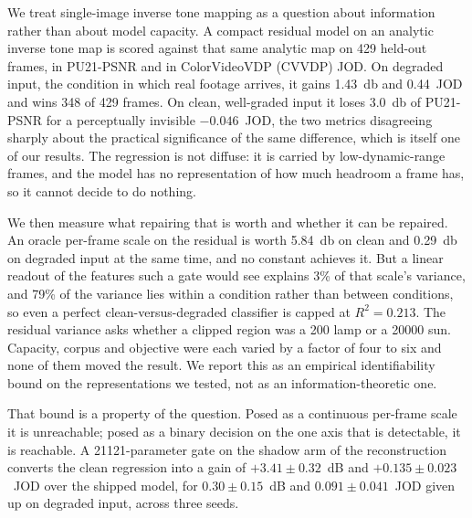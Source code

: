 We treat single-image inverse tone mapping as a question about information
rather than about model capacity. A compact residual model on an analytic
inverse tone map is scored against that same analytic map on 429 held-out
frames, in PU21-PSNR and in ColorVideoVDP (CVVDP) JOD. On degraded input, the
condition in which real footage arrives, it gains \SI{1.43}{\decibel} and
\num{0.44}~JOD and wins 348 of 429 frames. On clean, well-graded input it loses
\SI{3.0}{\decibel} of PU21-PSNR for a perceptually invisible $-0.046$~JOD, the two metrics
disagreeing sharply about the practical significance of the same difference,
which is itself one of our results. The regression is not diffuse: it is carried by
low-dynamic-range frames, and the model has no representation of how much
headroom a frame has, so it cannot decide to do nothing.

We then measure what repairing that is worth and whether it can be repaired. An
oracle per-frame scale on the residual is worth \SI{+5.84}{\decibel} on clean
and \SI{+0.29}{\decibel} on degraded input at the same time, and no constant
achieves it. But a linear readout of the features such a gate would see explains
\num{3}\% of that scale's variance, and \num{79}\% of the variance lies within a
condition rather than between conditions, so even a perfect
clean-versus-degraded classifier is capped at $R^2 = \num{0.213}$. The residual
variance asks whether a clipped region was a \SI{200}{\nits} lamp or a
\SI{20000}{\nits} sun. Capacity, corpus and objective were each varied by a
factor of four to six and none of them moved the result. We report this as an
empirical identifiability bound on the representations we tested, not as an
information-theoretic one.

That bound is a property of the question. Posed as a continuous per-frame scale
it is unreachable; posed as a binary decision on the one axis that is
detectable, it is reachable. A \num{21121}-parameter gate on the shadow arm of
the reconstruction converts the clean regression into a gain of
$+3.41 \pm 0.32$~dB and $+0.135 \pm 0.023$~JOD over the shipped model,
for $0.30 \pm 0.15$~dB and $0.091 \pm 0.041$~JOD given up on degraded
input, across three seeds.
